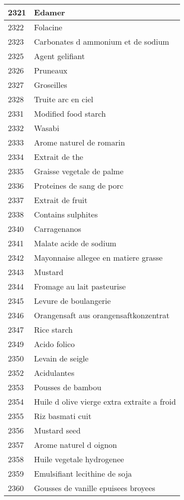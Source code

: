 \begin{longtable}{|l|l|}
2321 & Edamer \\ \hline 
2322 & Folacine \\ \hline 
2323 & Carbonates d ammonium et de sodium \\ \hline 
2325 & Agent gelifiant \\ \hline 
2326 & Pruneaux \\ \hline 
2327 & Groseilles \\ \hline 
2328 & Truite arc en ciel \\ \hline 
2331 & Modified food starch \\ \hline 
2332 & Wasabi \\ \hline 
2333 & Arome naturel de romarin \\ \hline 
2334 & Extrait de the \\ \hline 
2335 & Graisse vegetale de palme \\ \hline 
2336 & Proteines de sang de porc \\ \hline 
2337 & Extrait de fruit \\ \hline 
2338 & Contains sulphites \\ \hline 
2340 & Carragenanos \\ \hline 
2341 & Malate acide de sodium \\ \hline 
2342 & Mayonnaise allegee en matiere grasse \\ \hline 
2343 & Mustard \\ \hline 
2344 & Fromage au lait pasteurise \\ \hline 
2345 & Levure de boulangerie \\ \hline 
2346 & Orangensaft aus orangensaftkonzentrat \\ \hline 
2347 & Rice starch \\ \hline 
2349 & Acido folico \\ \hline 
2350 & Levain de seigle \\ \hline 
2352 & Acidulantes \\ \hline 
2353 & Pousses de bambou \\ \hline 
2354 & Huile d olive vierge extra extraite a froid \\ \hline 
2355 & Riz basmati cuit \\ \hline 
2356 & Mustard seed \\ \hline 
2357 & Arome naturel d oignon \\ \hline 
2358 & Huile vegetale hydrogenee \\ \hline 
2359 & Emulsifiant lecithine de soja \\ \hline 
2360 & Gousses de vanille epuisees broyees \\ \hline 

\end{longtable}
